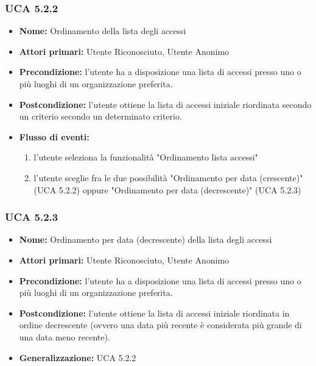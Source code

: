 \subsubsection{UCA 5.2.2}
\begin{itemize}
    \item \textbf{Nome:} Ordinamento della lista degli accessi
    \item \textbf{Attori primari:} Utente Riconosciuto, Utente Anonimo
    \item \textbf{Precondizione:} l’utente ha a disposizione una lista di accessi presso uno o più luoghi di un organizzazione preferita.
    \item \textbf{Postcondizione:} l’utente ottiene la lista di accessi iniziale riordinata secondo un criterio secondo un determinato criterio.
    \item \textbf{Flusso di eventi:}
    \begin{enumerate}
            \item l'utente seleziona la funzionalità "Ordinamento lista accessi"
            \item l'utente sceglie fra le due possibilità "Ordinamento per data (crescente)" (UCA 5.2.2) oppure "Ordinamento per data (decrescente)" (UCA 5.2.3)
    \end{enumerate}
\end{itemize}

\subsubsection{UCA 5.2.3}
\begin{itemize}
    \item \textbf{Nome:} Ordinamento per data (decrescente) della lista degli accessi
    \item \textbf{Attori primari:} Utente Riconosciuto, Utente Anonimo
    \item \textbf{Precondizione:} l’utente ha a disposizione una lista di accessi presso uno o più luoghi di un organizzazione preferita.
    \item \textbf{Postcondizione:} l’utente ottiene la lista di accessi iniziale riordinata in ordine decrescente (ovvero una data più recente è considerata più grande di una data meno recente).
    \item \textbf{Generalizzazione:} UCA 5.2.2
\end{itemize}

